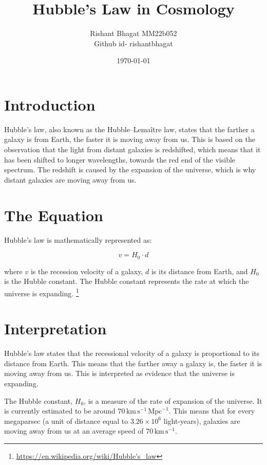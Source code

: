 \documentclass{article}
\begin{document}
\title{Hubble's Law in Cosmology}
\author{Rishant Bhagat MM22b052 \\ Github id- rishantbhagat}

\date{\today}

\maketitle

\section{Introduction}
Hubble's law, also known as the Hubble–Lemaître law, states that the farther a galaxy is from Earth, the faster it is moving away from us. This is based on the observation that the light from distant galaxies is redshifted, which means that it has been shifted to longer wavelengths, towards the red end of the visible spectrum. The redshift is caused by the expansion of the universe, which is why distant galaxies are moving away from us.
\section{The Equation}
Hubble's law is mathematically represented as:

\begin{equation}
v = H_0 \cdot d
\end{equation}

where $v$ is the recession velocity of a galaxy, $d$ is its distance from Earth, and $H_0$ is the Hubble constant. The Hubble constant represents the rate at which the universe is expanding.
\footnote{\url{https://en.wikipedia.org/wiki/Hubble's_law}}

\section{Interpretation}
Hubble's law states that the recessional velocity of a galaxy is proportional to its distance from Earth. This means that the farther away a galaxy is, the faster it is moving away from us. This is interpreted as evidence that the universe is expanding.

The Hubble constant, $H_0$, is a measure of the rate of expansion of the universe. It is currently estimated to be around $70 \, \text{km} \, \text{s}^{-1} \, \text{Mpc}^{-1}$. This means that for every megaparsec (a unit of distance equal to $3.26 \times 10^{6}$ light-years), galaxies are moving away from us at an average speed of $70 \, \text{km} \, \text{s}^{-1}$.
\end{document}

